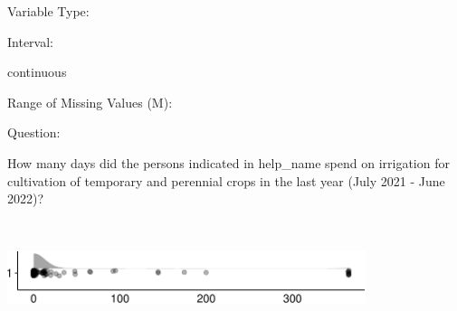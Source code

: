 \documentclass[
]{article}
\begin{document}
\begin{minipage}[t]{0.3\linewidth}

Variable Type:

\end{minipage}%
\begin{minipage}[t]{0.7\linewidth}

\end{minipage}

\begin{minipage}[t]{0.3\linewidth}

Interval:

\end{minipage}%
\begin{minipage}[t]{0.7\linewidth}

continuous

\end{minipage}

\begin{minipage}[t]{0.3\linewidth}

Range of Missing Values (M):

\end{minipage}%
\begin{minipage}[t]{0.7\linewidth}

\end{minipage}

\begin{minipage}[t]{0.3\linewidth}

Question:

\end{minipage}%
\begin{minipage}[t]{0.7\linewidth}

How many days did the persons indicated in help\_name spend on
irrigation for cultivation of temporary and perennial crops in the last
year (July 2021 - June 2022)?

\end{minipage}

\begin{minipage}[t]{0.3\linewidth}

~

\end{minipage}%
\begin{minipage}[t]{0.7\linewidth}

\includegraphics[width=396px]{codebook_template_files/figure-latex/q7_31_rainplot-1}

\end{minipage}
 \vspace*{-6mm} 
\end{document}
